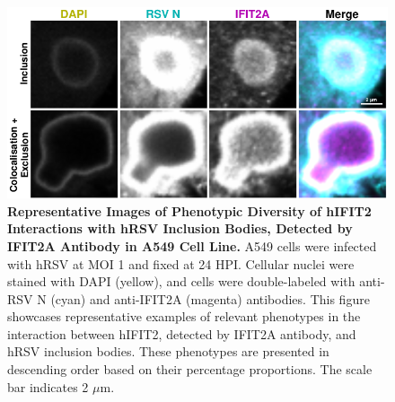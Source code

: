 \begin{figure}
    \centering
    \includegraphics[width=1\linewidth]{08. Chapter 3/Figs/02. Infection/02. IFIT2/01. IFIT2A/03. i2a-a549.pdf}
    \caption[Representative Images of Phenotypic Diversity of hIFIT2 Interactions with hRSV Inclusion Bodies, Detected by IFIT2A Antibody in A549 Cell Line.]{\textbf{Representative Images of Phenotypic Diversity of hIFIT2 Interactions with hRSV Inclusion Bodies, Detected by IFIT2A Antibody in A549 Cell Line.} A549 cells were infected with hRSV at MOI 1 and fixed at 24 HPI. Cellular nuclei were stained with DAPI (yellow), and cells were double-labeled with anti-RSV N (cyan) and anti-IFIT2A (magenta) antibodies. This figure showcases representative examples of relevant phenotypes in the interaction between hIFIT2, detected by IFIT2A antibody, and hRSV inclusion bodies. These phenotypes are presented in descending order based on their percentage proportions. The scale bar indicates 2 \(\mu \mbox{m}\).}
    \label{fig:Representative Images of Phenotypic Diversity of hIFIT2 Interactions with hRSV Inclusion Bodies, Detected by IFIT2A Antibody in A549 Cell Line}
\end{figure}

